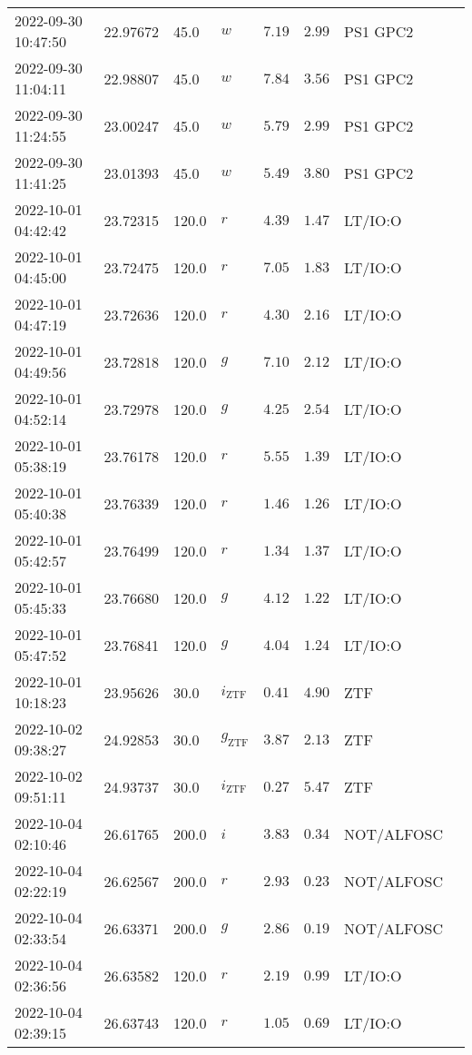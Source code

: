 \documentclass{nature_plusfigure}
\begin{document}
\begin{supplement}
\begin{center}
\begin{longtable}{llllllll}
2022-09-30 10:47:50 & 22.97672 & 45.0 & $w$ & $7.19$ & $2.99$ & PS1 GPC2 &  \\ 
2022-09-30 11:04:11 & 22.98807 & 45.0 & $w$ & $7.84$ & $3.56$ & PS1 GPC2 &  \\ 
2022-09-30 11:24:55 & 23.00247 & 45.0 & $w$ & $5.79$ & $2.99$ & PS1 GPC2 &  \\ 
2022-09-30 11:41:25 & 23.01393 & 45.0 & $w$ & $5.49$ & $3.80$ & PS1 GPC2 &  \\ 
2022-10-01 04:42:42 & 23.72315 & 120.0 & $r$ & $4.39$ & $1.47$ & LT/IO:O &  \\ 
2022-10-01 04:45:00 & 23.72475 & 120.0 & $r$ & $7.05$ & $1.83$ & LT/IO:O &  \\ 
2022-10-01 04:47:19 & 23.72636 & 120.0 & $r$ & $4.30$ & $2.16$ & LT/IO:O &  \\ 
2022-10-01 04:49:56 & 23.72818 & 120.0 & $g$ & $7.10$ & $2.12$ & LT/IO:O &  \\ 
2022-10-01 04:52:14 & 23.72978 & 120.0 & $g$ & $4.25$ & $2.54$ & LT/IO:O &  \\ 
2022-10-01 05:38:19 & 23.76178 & 120.0 & $r$ & $5.55$ & $1.39$ & LT/IO:O &  \\ 
2022-10-01 05:40:38 & 23.76339 & 120.0 & $r$ & $1.46$ & $1.26$ & LT/IO:O &  \\ 
2022-10-01 05:42:57 & 23.76499 & 120.0 & $r$ & $1.34$ & $1.37$ & LT/IO:O &  \\ 
2022-10-01 05:45:33 & 23.76680 & 120.0 & $g$ & $4.12$ & $1.22$ & LT/IO:O &  \\ 
2022-10-01 05:47:52 & 23.76841 & 120.0 & $g$ & $4.04$ & $1.24$ & LT/IO:O &  \\ 
2022-10-01 10:18:23 & 23.95626 & 30.0 & ${i}_\mathrm{ZTF}$ & $0.41$ & $4.90$ & ZTF &  \\ 
2022-10-02 09:38:27 & 24.92853 & 30.0 & ${g}_\mathrm{ZTF}$ & $3.87$ & $2.13$ & ZTF &  \\ 
2022-10-02 09:51:11 & 24.93737 & 30.0 & ${i}_\mathrm{ZTF}$ & $0.27$ & $5.47$ & ZTF &  \\ 
2022-10-04 02:10:46 & 26.61765 & 200.0 & $i$ & $3.83$ & $0.34$ & NOT/ALFOSC &  \\ 
2022-10-04 02:22:19 & 26.62567 & 200.0 & $r$ & $2.93$ & $0.23$ & NOT/ALFOSC &  \\ 
2022-10-04 02:33:54 & 26.63371 & 200.0 & $g$ & $2.86$ & $0.19$ & NOT/ALFOSC &  \\ 
2022-10-04 02:36:56 & 26.63582 & 120.0 & $r$ & $2.19$ & $0.99$ & LT/IO:O &  \\ 
2022-10-04 02:39:15 & 26.63743 & 120.0 & $r$ & $1.05$ & $0.69$ & LT/IO:O &  \\ 

\end{longtable}
\end{center}
\end{supplement}
\end{document}
